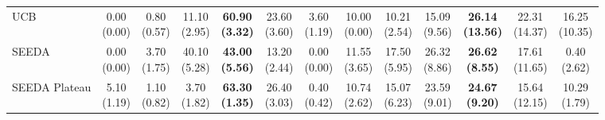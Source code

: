\begin{table}[H]
{\begin{tabular}{l|cccccc|cccccc}
UCB & \makecell{0.00 \\ (0.00)} & \makecell{0.80 \\ (0.57)} & {\cellcolor[HTML]{C8E6C9}} \makecell{11.10 \\ (2.95)} & \bfseries \makecell{60.90 \\ (3.32)} & \makecell{23.60 \\ (3.60)} & \makecell{3.60 \\ (1.19)} & \makecell{10.00 \\ (0.00)} & \makecell{10.21 \\ (2.54)} & {\cellcolor[HTML]{C8E6C9}} \makecell{15.09 \\ (9.56)} & \bfseries \makecell{26.14 \\ (13.56)} & \makecell{22.31 \\ (14.37)} & \makecell{16.25 \\ (10.35)} \\
SEEDA & \makecell{0.00 \\ (0.00)} & \makecell{3.70 \\ (1.75)} & {\cellcolor[HTML]{C8E6C9}} \makecell{40.10 \\ (5.28)} & \bfseries \makecell{43.00 \\ (5.56)} & \makecell{13.20 \\ (2.44)} & \makecell{0.00 \\ (0.00)} & \makecell{11.55 \\ (3.65)} & \makecell{17.50 \\ (5.95)} & {\cellcolor[HTML]{C8E6C9}} \makecell{26.32 \\ (8.86)} & \bfseries \makecell{26.62 \\ (8.55)} & \makecell{17.61 \\ (11.65)} & \makecell{0.40 \\ (2.62)} \\
SEEDA Plateau & \makecell{5.10 \\ (1.19)} & \makecell{1.10 \\ (0.82)} & {\cellcolor[HTML]{C8E6C9}} \makecell{3.70 \\ (1.82)} & \bfseries \makecell{63.30 \\ (1.35)} & \makecell{26.40 \\ (3.03)} & \makecell{0.40 \\ (0.42)} & \makecell{10.74 \\ (2.62)} & \makecell{15.07 \\ (6.23)} & {\cellcolor[HTML]{C8E6C9}} \makecell{23.59 \\ (9.01)} & \bfseries \makecell{24.67 \\ (9.20)} & \makecell{15.64 \\ (12.15)} & \makecell{10.29 \\ (1.79)} \\
\bottomrule
\end{tabular}
}%
\end{table}
